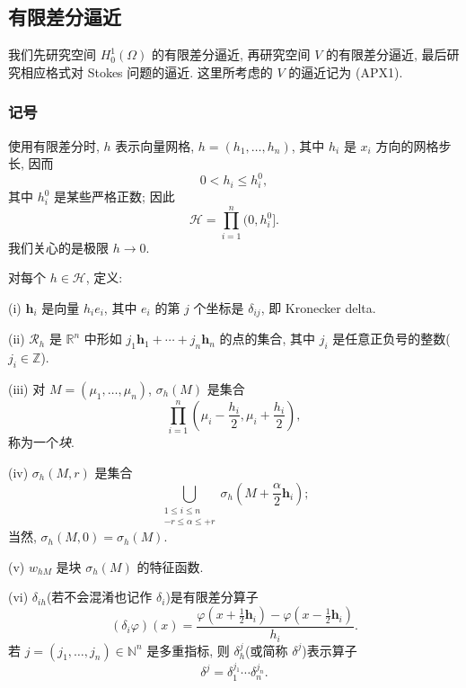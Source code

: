 \subsection{有限差分逼近}
\label{subsec:ch1-finite-difference-approximation}

我们先研究空间 $H_0^1(\Omega)$ 的有限差分逼近, 再研究空间 $V$ 的有限差分逼近, 最后研究相应格式对 Stokes 问题的逼近. 这里所考虑的 $V$ 的逼近记为 (APX1).

\subsubsection{记号}
\label{subsubsec:ch1-finite-difference-notation}

使用有限差分时, $h$ 表示向量网格, $h=(h_1,\ldots,h_n)$, 其中 $h_i$ 是 $x_i$ 方向的网格步长, 因而
\[
0<h_i\leq h_i^0,
\]
其中 $h_i^0$ 是某些严格正数; 因此
\begin{equation}
\mathcal H=\prod_{i=1}^n(0,h_i^0].
\label{eq:ch1-mesh-parameter-set}
\end{equation}
我们关心的是极限 $h\to0$.

对每个 $h\in\mathcal H$, 定义:

(i) $\mathbf h_i$ 是向量 $h_i e_i$, 其中 $e_i$ 的第 $j$ 个坐标是 $\delta_{ij}$, 即 Kronecker delta.

(ii) $\mathcal R_h$ 是 $\mathbb R^n$ 中形如 $j_1\mathbf h_1+\cdots+j_n\mathbf h_n$ 的点的集合, 其中 $j_i$ 是任意正负号的整数($j_i\in\mathbb Z$).

(iii) 对 $M=(\mu_1,\ldots,\mu_n)$, $\sigma_h(M)$ 是集合
\[
\prod_{i=1}^n\left(\mu_i-\frac{h_i}{2},\mu_i+\frac{h_i}{2}\right),
\]
称为一个\emph{块}.

(iv) $\sigma_h(M,r)$ 是集合
\[
\bigcup_{\substack{1\leq i\leq n\\-r\leq\alpha\leq+r}}
\sigma_h\left(M+\frac{\alpha}{2}\mathbf h_i\right);
\]
当然, $\sigma_h(M,0)=\sigma_h(M)$.

(v) $w_{hM}$ 是块 $\sigma_h(M)$ 的特征函数.

(vi) $\delta_{ih}$(若不会混淆也记作 $\delta_i$)是有限差分算子
\begin{equation}
(\delta_i\varphi)(x)
=\frac{\varphi(x+\frac12\mathbf h_i)-\varphi(x-\frac12\mathbf h_i)}{h_i}.
\label{eq:ch1-centered-difference}
\end{equation}
若 $j=(j_1,\ldots,j_n)\in\mathbb N^n$ 是多重指标, 则 $\delta_h^j$(或简称 $\delta^j$)表示算子
\begin{equation}
\delta^j=\delta_1^{j_1}\cdots\delta_n^{j_n}.
\label{eq:ch1-multiindex-difference}
\end{equation}

